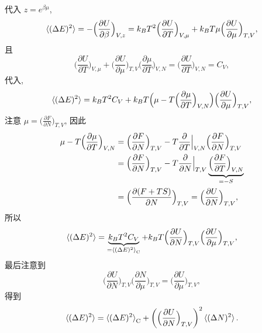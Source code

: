 \begin{itemize}
\begin{tcolorbox}[title=calculation:]
		代入 $z = e^{\beta \mu}$,
		\begin{equation}
			\braket{(\Delta E)^2} = - \Big( \frac{\partial U}{\partial \beta} \Big)_{V, z} = k_B T^2 \Big( \frac{\partial U}{\partial T} \Big)_{V, \mu} + k_B T \mu \Big( \frac{\partial U}{\partial \mu} \Big)_{T, V},
		\end{equation}
		且
		\begin{equation}
			\Big( \frac{\partial U}{\partial T} \Big)_{V, \mu} + \Big( \frac{\partial U}{\partial \mu} \Big)_{T, V} \Big( \frac{\partial \mu}{\partial T} \Big)_{V, N} = \Big( \frac{\partial U}{\partial T} \Big)_{V, N} = C_V,
		\end{equation}
		代入,
		\begin{equation}
			\braket{(\Delta E)^2} = k_B T^2 C_V + k_B T \Big( \mu - T \Big( \frac{\partial \mu}{\partial T} \Big)_{V, N} \Big) \Big( \frac{\partial U}{\partial \mu} \Big)_{T, V},
		\end{equation}
		注意 $\mu = \big( \frac{\partial F}{\partial N} \big)_{T, V}$, 因此
		\begin{align}
			\mu - T \Big( \frac{\partial \mu}{\partial T} \Big)_{V, N} &= \Big( \frac{\partial F}{\partial N} \Big)_{T, V} - T \frac{\partial}{\partial T} \Big|_{V, N} \Big( \frac{\partial F}{\partial N} \Big)_{T, V} \notag \\
			&= \Big( \frac{\partial F}{\partial N} \Big)_{T, V} - T \frac{\partial}{\partial N} \Big|_{T, V} \underbrace{\Big( \frac{\partial F}{\partial T} \Big)_{V, N}}_{= - S} \notag \\
			&= \Big( \frac{\partial (F + T S)}{\partial N} \Big)_{T, V} = \Big( \frac{\partial U}{\partial N} \Big)_{T, V},
		\end{align}
		所以
		\begin{equation}
			\braket{(\Delta E)^2} = \underbrace{k_B T^2 C_V}_{= \braket{(\Delta E)^2}_\text{C}} + k_B T \Big( \frac{\partial U}{\partial N} \Big)_{T, V} \Big( \frac{\partial U}{\partial \mu} \Big)_{T, V},
		\end{equation}
		最后注意到
		\begin{equation}
			\Big( \frac{\partial U}{\partial N} \Big)_{T, V} \Big( \frac{\partial N}{\partial \mu} \Big)_{T, V} = \Big( \frac{\partial U}{\partial \mu} \Big)_{T, V},
		\end{equation}
		得到
		\begin{equation}
			\braket{(\Delta E)^2} = \braket{(\Delta E)^2}_\text{C} + \bigg( \Big( \frac{\partial U}{\partial N} \Big)_{T, V} \bigg)^2 \braket{(\Delta N)^2}.
		\end{equation}
	\end{tcolorbox}
\end{itemize}

